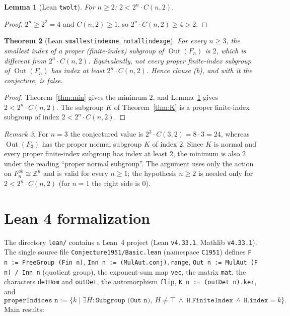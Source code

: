 \documentclass[11pt]{article}
\newtheorem{theorem}{Theorem}
\newtheorem{lemma}[theorem]{Lemma}
\theoremstyle{definition}
\theoremstyle{remark}
\newtheorem{remark}[theorem]{Remark}
\renewcommand{\_}{\oldus\allowbreak}
\newcommand{\Z}{\mathbb{Z}}
\newcommand{\Out}{\operatorname{Out}}
\begin{document}
\begin{lemma}[Lean \texttt{two\_lt}]\label{lem:two}
For $n\ge 2$: $2<2^n\cdot C(n,2)$.
\end{lemma}
\begin{proof}
$2^n\ge 2^2=4$ and $C(n,2)\ge 1$, so $2^n\cdot C(n,2)\ge 4>2$.
\end{proof}

\begin{theorem}[Lean \texttt{smallest\_index\_ne}, \texttt{not\_all\_index\_ge}]\label{thm:main}
For every $n\ge 3$, the smallest index of a proper (finite-index) subgroup of $\Out(F_n)$ is $2$, which is
different from $2^n\cdot C(n,2)$. Equivalently, not every proper finite-index subgroup of $\Out(F_n)$ has
index at least $2^n\cdot C(n,2)$. Hence clause (b), and with it the conjecture, is false.
\end{theorem}
\begin{proof}
Theorem~\ref{thm:min} gives the minimum $2$, and Lemma~\ref{lem:two} gives $2<2^n\cdot C(n,2)$. The subgroup
$K$ of Theorem~\ref{thm:K} is a proper finite-index subgroup of index $2<2^n\cdot C(n,2)$.
\end{proof}

\begin{remark}
For $n=3$ the conjectured value is $2^3\cdot C(3,2)=8\cdot 3=24$, whereas $\Out(F_3)$ has the proper
normal subgroup $K$ of index $2$. Since $K$ is normal and every proper finite-index subgroup has index at
least $2$, the minimum is also $2$ under the reading ``proper normal subgroup''. The argument uses only the
action on $F_n^{ab}\cong\Z^n$ and is valid for every $n\ge 1$; the hypothesis $n\ge 2$ is needed only for
$2<2^n\cdot C(n,2)$ (for $n=1$ the right side is $0$).
\end{remark}

\section{Lean 4 formalization}

The directory \texttt{lean/} contains a Lean~4 project (Lean \texttt{v4.33.1}, Mathlib \texttt{v4.33.1}).
The single source file \texttt{Conjecture1951/Basic.lean} (namespace \texttt{C1951}) defines
\texttt{F n := FreeGroup (Fin n)}, \texttt{Inn n := (MulAut.conj).range},
\texttt{Out n := MulAut (F n) / Inn n} (quotient group), the exponent-sum map \texttt{vec}, the
matrix \texttt{mat}, the characters \texttt{detHom} and \texttt{outDet}, the automorphism \texttt{flip},
\texttt{K n := (outDet n).ker}, and
\[
  \texttt{properIndices n} := \{k \mid \exists H : \texttt{Subgroup (Out n)},\ H\ne\top\ \wedge\
  \texttt{H.FiniteIndex}\ \wedge\ \texttt{H.index} = k\}.
\]
Main results:
\end{document}
